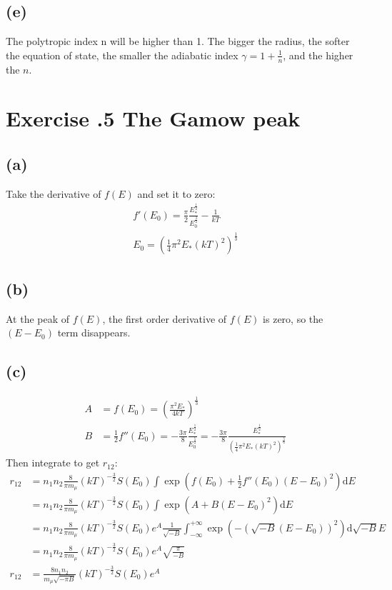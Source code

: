 \documentclass[a4paper,12pt]{article}
\renewcommand{\d}{\mathrm{d}}
\begin{document}
\subsection*{(e)}
The polytropic index n will be higher than 1. The bigger the radius, the softer the equation of state, 
the smaller the adiabatic index $\gamma = 1 + \frac{1}{n}$, and the higher the $n$.


\section*{\textbf{Exercise \uppercase\expandafter{}.5 The Gamow peak}}
\subsection*{(a)}
Take the derivative of $f(E)$ and set it to zero:
\begin{align*}
    f'(E_0) = \frac{\pi}{2} \frac{E_*^{\frac{1}{2}}}{E_0^{\frac{3}{2}}} - \frac{1}{kT}\\
    E_0 = (\frac{1}{4} \pi^2 E_* (kT)^2)^{\frac{1}{3}}
\end{align*}

\subsection*{(b)}
At the peak of $f(E)$, the first order derivative of $f(E)$ is zero, so the $(E - E_0)$ term disappears.

\subsection*{(c)}
\begin{align*}
    A &= f(E_0) = (\frac{\pi^2 E_*}{4kT})^{\frac{1}{3}} \\
    B &= \frac{1}{2} f''(E_0) = -\frac{3\pi}{8} \frac{E_*^{\frac{1}{2}}}{E_0^{\frac{5}{2}}}
     = -\frac{3\pi}{8} \frac{E_*^{\frac{1}{2}}}{(\frac{1}{4} \pi^2 E_* (kT)^2)^{\frac{5}{6}}}
\end{align*}
Then integrate to get $r_{12}$:
\begin{align*}
    r_{12} &= n_1 n_2 \frac{8}{\pi m_\mu} (kT)^{-\frac{3}{2}} S(E_0) \int \exp(f(E_0) + \frac{1}{2} f''(E_0) (E-E_0)^2) \d E\\
    &= n_1 n_2 \frac{8}{\pi m_\mu} (kT)^{-\frac{3}{2}} S(E_0) \int \exp(A + B (E-E_0)^2) \d E\\
    &= n_1 n_2 \frac{8}{\pi m_\mu} (kT)^{-\frac{3}{2}} S(E_0) e^A \frac{1}{\sqrt{-B}} \int_{-\infty}^{+\infty} \exp(- (\sqrt{-B}(E-E_0))^2) \d \sqrt{-B} E\\
    &= n_1 n_2 \frac{8}{\pi m_\mu} (kT)^{-\frac{3}{2}} S(E_0) e^A \sqrt{\frac{\pi}{-B}} \\
    r_{12}&= \frac{8n_1 n_2}{m_\mu \sqrt{- \pi B}} (kT)^{-\frac{3}{2}} S(E_0) e^A
\end{align*}
\end{document}
